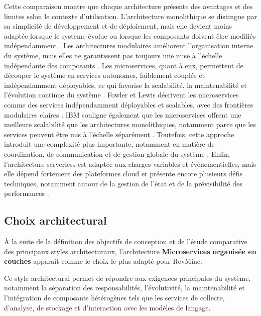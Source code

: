 Cette comparaison montre que chaque architecture présente des avantages et des limites selon le contexte d’utilisation. L’architecture monolithique se distingue par sa simplicité de développement et de déploiement, mais elle devient moins adaptée lorsque le système évolue ou lorsque les composants doivent être modifiés indépendamment \cite{richards2015software}. Les architectures modulaires améliorent l’organisation interne du système, mais elles ne garantissent pas toujours une mise à l’échelle indépendante des composants \cite{richards2015software}. Les microservices, quant à eux, permettent de découper le système en services autonomes, faiblement couplés et indépendamment déployables, ce qui favorise la scalabilité, la maintenabilité et l’évolution continue du système \cite{fowler2014microservices,newman2021building}. Fowler et Lewis décrivent les microservices comme des services indépendamment déployables et scalables, avec des frontières modulaires claires \cite{fowler2014microservices}. IBM souligne également que les microservices offrent une meilleure scalabilité que les architectures monolithiques, notamment parce que les services peuvent être mis à l’échelle séparément \cite{ibm2024monolithicMicroservices}. Toutefois, cette approche introduit une complexité plus importante, notamment en matière de coordination, de communication et de gestion globale du système \cite{richards2015software,newman2021building}. Enfin, l’architecture serverless est adaptée aux charges variables et événementielles, mais elle dépend fortement des plateformes cloud et présente encore plusieurs défis techniques, notamment autour de la gestion de l’état et de la prévisibilité des performances \cite{baldini2017serverless}.

\subsection{Choix architectural}

À la suite de la définition des objectifs de conception et de l’étude comparative des principaux styles architecturaux, l’architecture \textbf{Microservices organisée en couches} apparaît comme le choix le plus adapté pour RevMine.

Ce style architectural permet de répondre aux exigences principales du système, notamment la séparation des responsabilités, l’évolutivité, la maintenabilité et l’intégration de composants hétérogènes tels que les services de collecte, d’analyse, de stockage et d’interaction avec les modèles de langage.

